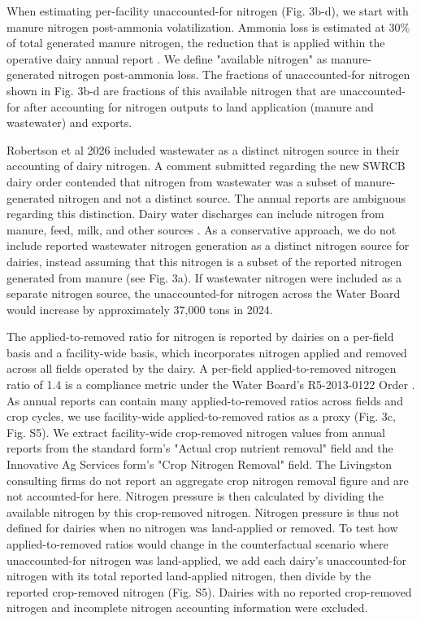 \documentclass{iopjournal}
\begin{document}
When estimating per-facility unaccounted-for nitrogen (Fig. 3b-d), we start with manure nitrogen post-ammonia volatilization. Ammonia loss is estimated at 30\% of total generated manure nitrogen, the reduction that is applied within the operative dairy annual report \cite{CVRWQCB_2013_Order}. We define "available nitrogen" as manure-generated nitrogen post-ammonia loss. The fractions of unaccounted-for nitrogen shown in Fig. 3b-d are fractions of this available nitrogen that are unaccounted-for after accounting for nitrogen outputs to land application (manure and wastewater) and exports.

Robertson et al 2026 \cite{Robertson_2026} included wastewater as a distinct nitrogen source in their accounting of dairy nitrogen. A comment \cite{Dairy_Order_Comments_2026} submitted regarding the new SWRCB dairy order \cite{SWRCB_2026_Order} contended that nitrogen from wastewater was a subset of manure-generated nitrogen and not a distinct source. The annual reports are ambiguous regarding this distinction. Dairy water discharges can include nitrogen from manure, feed, milk, and other sources \cite{SWRCB_2026_Order, USDA_2008, Ali_2006}. As a conservative approach, we do not include reported wastewater nitrogen generation as a distinct nitrogen source for dairies, instead assuming that this nitrogen is a subset of the reported nitrogen generated from manure (see Fig. 3a). If wastewater nitrogen were included as a separate nitrogen source, the unaccounted-for nitrogen across the Water Board would increase by approximately 37,000 tons in 2024.

The applied-to-removed ratio for nitrogen is reported by dairies on a per-field basis and a facility-wide basis, which incorporates nitrogen applied and removed across all fields operated by the dairy. A per-field applied-to-removed nitrogen ratio of 1.4 is a compliance metric under the Water Board's R5-2013-0122 Order \cite{CVRWQCB_2013_Order}. As annual reports can contain many applied-to-removed ratios across fields and crop cycles, we use facility-wide applied-to-removed ratios as a proxy (Fig. 3c, Fig. S5). We extract facility-wide crop-removed nitrogen values from annual reports from the standard form's "Actual crop nutrient removal" field and the Innovative Ag Services form's "Crop Nitrogen Removal" field. The Livingston consulting firms do not report an aggregate crop nitrogen removal figure and are not accounted-for here. Nitrogen pressure is then calculated by dividing the available nitrogen by this crop-removed nitrogen. Nitrogen pressure is thus not defined for dairies when no nitrogen was land-applied or removed. To test how applied-to-removed ratios would change in the counterfactual scenario where unaccounted-for nitrogen was land-applied, we add each dairy's unaccounted-for nitrogen with its total reported land-applied nitrogen, then divide by the reported crop-removed nitrogen (Fig. S5). Dairies with no reported crop-removed nitrogen and incomplete nitrogen accounting information were excluded.
\end{document}
